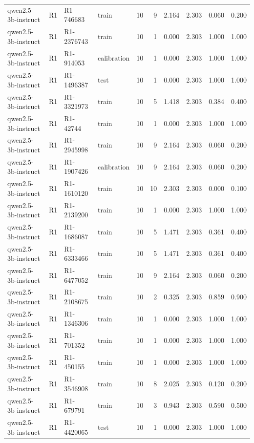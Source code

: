 \begin{table}
\begin{tabular}{llllrrrrrr}
qwen2.5-3b-instruct & R1 & R1-746683 & train & 10 & 9 & 2.164 & 2.303 & 0.060 & 0.200 \\
qwen2.5-3b-instruct & R1 & R1-2376743 & train & 10 & 1 & 0.000 & 2.303 & 1.000 & 1.000 \\
qwen2.5-3b-instruct & R1 & R1-914053 & calibration & 10 & 1 & 0.000 & 2.303 & 1.000 & 1.000 \\
qwen2.5-3b-instruct & R1 & R1-1496387 & test & 10 & 1 & 0.000 & 2.303 & 1.000 & 1.000 \\
qwen2.5-3b-instruct & R1 & R1-3321973 & train & 10 & 5 & 1.418 & 2.303 & 0.384 & 0.400 \\
qwen2.5-3b-instruct & R1 & R1-42744 & train & 10 & 1 & 0.000 & 2.303 & 1.000 & 1.000 \\
qwen2.5-3b-instruct & R1 & R1-2945998 & train & 10 & 9 & 2.164 & 2.303 & 0.060 & 0.200 \\
qwen2.5-3b-instruct & R1 & R1-1907426 & calibration & 10 & 9 & 2.164 & 2.303 & 0.060 & 0.200 \\
qwen2.5-3b-instruct & R1 & R1-1610120 & train & 10 & 10 & 2.303 & 2.303 & 0.000 & 0.100 \\
qwen2.5-3b-instruct & R1 & R1-2139200 & train & 10 & 1 & 0.000 & 2.303 & 1.000 & 1.000 \\
qwen2.5-3b-instruct & R1 & R1-1686087 & train & 10 & 5 & 1.471 & 2.303 & 0.361 & 0.400 \\
qwen2.5-3b-instruct & R1 & R1-6333466 & train & 10 & 5 & 1.471 & 2.303 & 0.361 & 0.400 \\
qwen2.5-3b-instruct & R1 & R1-6477052 & train & 10 & 9 & 2.164 & 2.303 & 0.060 & 0.200 \\
qwen2.5-3b-instruct & R1 & R1-2108675 & train & 10 & 2 & 0.325 & 2.303 & 0.859 & 0.900 \\
qwen2.5-3b-instruct & R1 & R1-1346306 & train & 10 & 1 & 0.000 & 2.303 & 1.000 & 1.000 \\
qwen2.5-3b-instruct & R1 & R1-701352 & train & 10 & 1 & 0.000 & 2.303 & 1.000 & 1.000 \\
qwen2.5-3b-instruct & R1 & R1-450155 & train & 10 & 1 & 0.000 & 2.303 & 1.000 & 1.000 \\
qwen2.5-3b-instruct & R1 & R1-3546908 & train & 10 & 8 & 2.025 & 2.303 & 0.120 & 0.200 \\
qwen2.5-3b-instruct & R1 & R1-679791 & train & 10 & 3 & 0.943 & 2.303 & 0.590 & 0.500 \\
qwen2.5-3b-instruct & R1 & R1-4420065 & test & 10 & 1 & 0.000 & 2.303 & 1.000 & 1.000 \\

\end{tabular}
\end{table}
